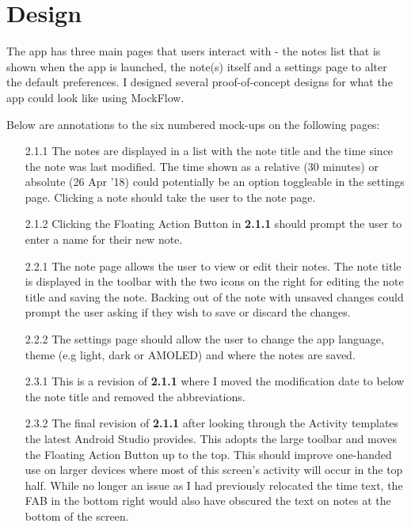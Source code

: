 \chapter{Design}
\graphicspath{{2-design/images/}}

The app has three main pages that users interact with - the notes list that is shown when the app is launched, the note(s) itself and a settings page to alter the default preferences. I designed several proof-of-concept designs for what the app could look like using MockFlow.

Below are annotations to the six numbered mock-ups on the following pages:
\begin{enumerate}
  \item[2.1.1] The notes are displayed in a list with the note title and the time since the note was last modified. The time shown as a relative (30 minutes) or absolute (26 Apr '18) could potentially be an option toggleable in the settings page. Clicking a note should take the user to the note page.

  \item[2.1.2] Clicking the Floating Action Button in \textbf{2.1.1} should prompt the user to enter a name for their new note.

  \item[2.2.1] The note page allows the user to view or edit their notes. The note title is displayed in the toolbar with the two icons on the right for editing the note title and saving the note. Backing out of the note with unsaved changes could prompt the user asking if they wish to save or discard the changes.

  \item[2.2.2] The settings page should allow the user to change the app language, theme (e.g light, dark or AMOLED) and where the notes are saved.

  \item[2.3.1] This is a revision of \textbf{2.1.1} where I moved the modification date to below the note title and removed the abbreviations.

  \item[2.3.2] The final revision of \textbf{2.1.1} after looking through the Activity templates the latest Android Studio provides. This adopts the large toolbar and moves the Floating Action Button up to the top. This should improve one-handed use on larger devices where most of this screen's activity will occur in the top half. While no longer an issue as I had previously relocated the time text, the FAB in the bottom right would also have obscured the text on notes at the bottom of the screen.
\end{enumerate}

